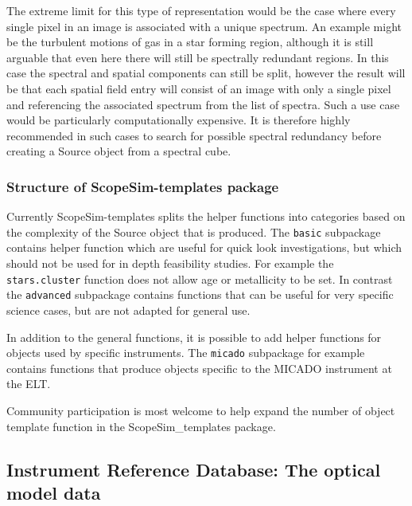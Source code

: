 The extreme limit for this type of representation would be the case where every single pixel in an image is associated with a unique spectrum.
An example might be the turbulent motions of gas in a star forming region, although it is still arguable that even here there will still be spectrally redundant regions.
In this case the spectral and spatial components can still be split, however the result will be that each spatial field entry will consist of an image with only a single pixel and referencing the associated spectrum from the list of spectra.
Such a use case would be particularly computationally expensive.
It is therefore highly recommended in such cases to search for possible spectral redundancy before creating a \textquotedbl{}Source\textquotedbl{} object from a spectral cube.


\subsubsection{Structure of ScopeSim-templates package%
  \label{structure-of-scopesim-templates-package}%
}

Currently ScopeSim-templates splits the helper functions into categories based on the complexity of the Source object that is produced.
The \texttt{basic} subpackage contains helper function which are useful for quick look investigations, but which should not be used for in depth feasibility studies.
For example the \texttt{stars.cluster} function does not allow age or metallicity to be set.
In contrast the \texttt{advanced} subpackage contains functions that can be useful for very specific science cases, but are not adapted for general use.

In addition to the general functions, it is possible to add helper functions for objects used by specific instruments.
The \texttt{micado} subpackage for example contains functions that produce objects specific to the MICADO instrument at the ELT.

Community participation is most welcome to help expand the number of object template function in the ScopeSim\_templates package.


\subsection{Instrument Reference Database: The optical model data%
  \label{instrument-reference-database-the-optical-model-data}%
}


